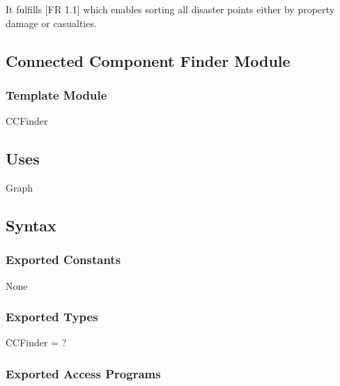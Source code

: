 \documentclass[12pt]{article}
\begin{document}
                It fulfills [FR 1.1] which enables sorting all disaster points either by property damage or casualties.
                
                \newpage
                \subsection* {Connected Component Finder Module}
                
                \subsubsection*{Template Module}
                
                CCFinder
                
                \subsection* {Uses}
                
                Graph
                
                \subsection* {Syntax}
                
                \subsubsection* {Exported Constants}
                
                None

                \subsubsection* {Exported Types}
                
                CCFinder = ?

                \subsubsection* {Exported Access Programs}
                
\end{document}
